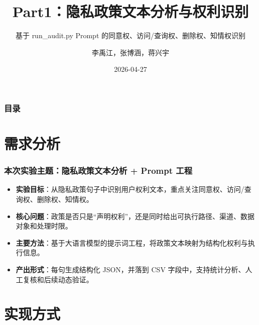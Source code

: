 \documentclass[AutoFakeBold,AutoFakeSlant]{beamer}
\author{李禹江，张博涵，蒋兴宇}
\title{Part1：隐私政策文本分析与权利识别}
\subtitle{基于 run\_audit.py Prompt 的同意权、访问/查询权、删除权、知情权识别}
\institute{我的刀盾队}
\date{2026-04-27}
\begin{document}
\kaishu

\begin{frame}
    \titlepage
\end{frame}

\begin{frame}
    \frametitle{目录}
    \tableofcontents
\end{frame}

\section{需求分析}

\begin{frame}
    \frametitle{本次实验主题：隐私政策文本分析 + Prompt 工程}
    \small
    \begin{itemize}
        \item \textbf{实验目标}：从隐私政策句子中识别用户权利文本，重点关注同意权、访问/查询权、删除权、知情权。
        \item \textbf{核心问题}：政策是否只是“声明权利”，还是同时给出可执行路径、渠道、数据对象和处理时限。
        \item \textbf{主要方法}：基于大语言模型的提示词工程，将政策文本映射为结构化权利与执行信息。
        \item \textbf{产出形式}：每句生成结构化 JSON，并落到 CSV 字段中，支持统计分析、人工复核和后续动态验证。
    \end{itemize}
\end{frame}

\section{实现方式}
\end{document}

